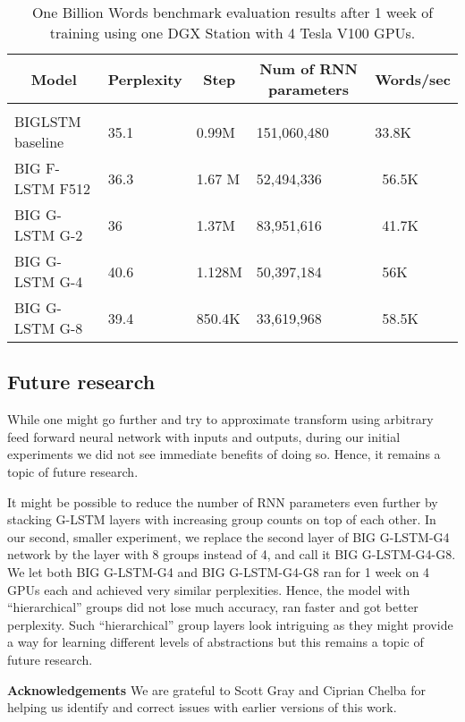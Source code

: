 \documentclass{article} \usepackage{iclr2017_workshop,times}
\begin{document}
\begin{table}[t]
\caption{One Billion Words benchmark evaluation results after 1 week of training using one DGX Station with 4 Tesla V100 GPUs.}
\label{1bwbm-1week}
\begin{center}
\begin{tabular}{lllll}
\multicolumn{1}{c}{\bf Model}  &\multicolumn{1}{c}{\bf Perplexity}  &\multicolumn{1}{c}{\bf Step} &\multicolumn{1}{c}{\bf Num of RNN parameters} &\multicolumn{1}{c}{\bf Words/sec}
\\ \hline \\
BIGLSTM baseline  & 35.1         & 0.99M & 151,060,480 & 33.8K\\
BIG F-LSTM F512   & 36.3         & 1.67 M & 52,494,336 & ~56.5K\\
BIG G-LSTM G-2    & 36           & 1.37M  & 83,951,616 & ~41.7K\\
BIG G-LSTM G-4    & 40.6         & 1.128M & 50,397,184 & ~56K\\
BIG G-LSTM G-8    & 39.4         & 850.4K & 33,619,968 & ~58.5K\\
\end{tabular}
\end{center}
\end{table}
\subsection{Future research}

While one might go further and try to approximate  transform  using arbitrary feed forward neural network with  inputs and  outputs, during our initial experiments we did not see immediate benefits of doing so. Hence, it remains a topic of future research.

It might be possible to reduce the number of RNN parameters even further by stacking G-LSTM layers with increasing group counts on top of each other. 
In our second, smaller experiment, we replace the second layer of BIG G-LSTM-G4 network by the layer with 8 groups instead of 4, and call it BIG G-LSTM-G4-G8. We let both BIG G-LSTM-G4 and BIG G-LSTM-G4-G8 ran for 1 week on 4 GPUs each and achieved very similar perplexities. Hence, the model with ``hierarchical'' groups did not lose much accuracy, ran faster and got better perplexity. Such ``hierarchical'' group layers look intriguing as they might provide a way for learning different levels of abstractions but this remains a topic of future research.

{\bf Acknowledgements} 
We are grateful to Scott Gray and Ciprian Chelba for helping us identify and correct issues with earlier versions of this work.
\end{document}
